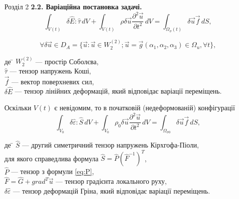 \documentclass[8pt]{beamer}
\numberwithin{figure}{section}
\numberwithin{equation}{section}
\numberwithin{table}{section}
\begin{document}
\begin{frame}{Розділ 2}
\textbf{2.2. Варіаційна постановка задачі.}
\begin{equation}
\int_{V(t)} \delta\hat{E}:\hat{\tau}\,dV+\int_{V(t)} \rho \delta\vec{u} \frac{\partial^2 \vec{u}}{\partial t ^2}\,dV=\int_{\Omega_\sigma(t)} \delta\vec{u} \vec{f} \,dS ,
\end{equation}

\[
\forall \delta\vec{u} \in D_A 
= \{ 
\vec{u}:\vec{u}\in W_2^{(2)}; 
\vec{u}=\vec{g} \left( \alpha_1, \alpha_2,\alpha_3 \right) \in \Omega_{u}, \forall t \},
\]

\begin{tabbing}
де \= $ W_2^{(2)}$ --- простір Соболєва,\\
\> $\hat{\tau}$ --- тензор напружень Коші,\\
\> $\vec{f}$ --- вектор поверхневих сил,\\
\> $\delta\hat{E}$ --- тензор лінійних деформацій, який відповідає варіації переміщень.
\end{tabbing}
Оскільки $V(t)$ є невідомим, то в початковій (недеформованій) конфігурації
\begin{equation}\label{eq:virtwork_gen}
\int_{V_0} \delta\hat{\varepsilon}:\hat{S}\,dV+\int_{V_0} \rho_0 \delta\vec{u} \frac{\partial^2 \vec{u}}{\partial t ^2}\,dV=\int_{\Omega_{\sigma0}} \delta\vec{u} \vec{f} \,dS,
\end{equation}

\begin{tabbing}
де \= $\hat{S}$ --- другий симетричний тензор напружень Кірхгофа-Піоли, \\для якого справедлива формула $\hat{S} = \hat{P} \left( \hat{F}^{-1} \right)^T $,\\
\> $\hat{P}$ --- тензор з формули \ref{eq:P},\\
\> $\hat{F}=\hat{G} + grad^T \vec{u}$ --- тензор градієнта локального руху,\\
\> $\delta\hat{\varepsilon}$ --- тензор деформацій Гріна, який відповідає варіації переміщень.
\end{tabbing}


\end{frame}
\end{document}

